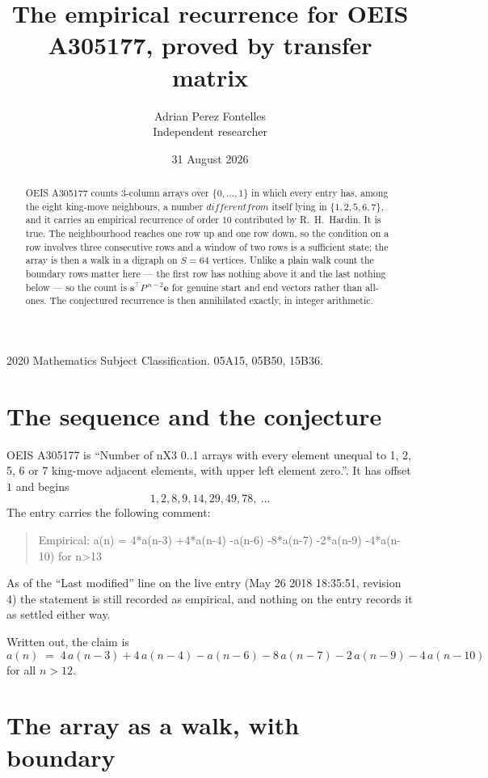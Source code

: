 \documentclass[11pt,a4paper]{article}
\title{The empirical recurrence for OEIS A305177, proved by transfer matrix}
\author{Adrian Perez Fontelles\\ \small Independent researcher}
\date{31 August 2026}
\theoremstyle{plain}
\theoremstyle{definition}
\begin{document}
\maketitle

\begin{abstract}
OEIS A305177 counts $3$-column arrays over $\{0,\dots,1\}$ in which every entry has,
among the eight king-move neighbours, a number $different from$ itself lying in $\{1,2,5,6,7\}$, and it carries an empirical
recurrence of order $10$ contributed by R.~H.~Hardin. It is true. The neighbourhood
reaches one row up and one row down, so the condition on a row involves three consecutive
rows and a window of two rows is a sufficient state; the array is then a walk in a digraph
on $S=64$ vertices. Unlike a plain walk count the boundary rows matter here --- the first
row has nothing above it and the last nothing below --- so the count is
$\mathbf{s}^{\!\top}P^{\,n-2}\mathbf{e}$ for genuine start and end vectors rather than
all-ones. The conjectured recurrence is then annihilated exactly, in integer arithmetic.
\end{abstract}

\noindent\small 2020 Mathematics Subject Classification. 05A15, 05B50, 15B36.\normalsize

\section{The sequence and the conjecture}

OEIS A305177 is ``Number of nX3 0..1 arrays with every element unequal to 1, 2, 5, 6 or 7 king-move adjacent elements, with upper left element zero.''. It has offset
$1$ and begins
\[
1, 2, 8, 9, 14, 29, 49, 78,\ \dots
\]
The entry carries the following comment:
\begin{quote}\small
Empirical: a(n) = 4*a(n-3) +4*a(n-4) -a(n-6) -8*a(n-7) -2*a(n-9) -4*a(n-10) for n>13
\end{quote}
As of the ``Last modified'' line on the live entry (May 26 2018 18:35:51, revision
4) the statement is still recorded as empirical, and nothing on the entry
records it as settled either way.

Written out, the claim is
\begin{equation}\label{eq:conj}
a(n)\;=\;4\,a(n-3) + 4\,a(n-4) - a(n-6) - 8\,a(n-7) - 2\,a(n-9) - 4\,a(n-10)
\end{equation}
for all $n>12$.

\section{The array as a walk, with boundary}
\end{document}
